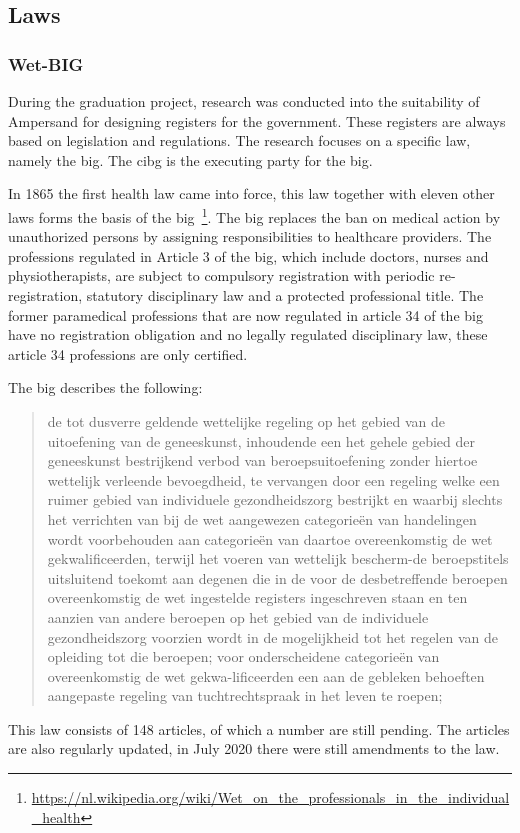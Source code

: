 \subsection{Laws} \label{subsection:law}
\subsubsection{Wet-BIG} \label{subsubsection:wet-big}
During the graduation project, research was conducted into the suitability of Ampersand for designing registers for the government.
These registers are always based on legislation and regulations.
The research focuses on a specific law, namely the \acrshort{big}.
The \acrshort{cibg} is the executing party for the \acrshort{big}.

In 1865 the first health law came into force, this law together with eleven other laws forms the basis of the \acrfull{big}~\footnote{\url{https://nl.wikipedia.org/wiki/Wet_on_the_professionals_in_the_individual_health}}.
The \acrshort{big} replaces the ban on medical action by unauthorized persons by assigning responsibilities to healthcare providers.
The professions regulated in Article 3 of the \acrshort{big}, which include doctors, nurses and physiotherapists, are subject to compulsory registration with periodic re-registration, statutory disciplinary law and a protected professional title.
The former paramedical professions that are now regulated in article 34 of the \acrshort{big} have no registration obligation and no legally regulated disciplinary law, these article 34 professions are only certified.

The \acrshort{big} describes the following:
\blockquote{de tot dusverre geldende wettelijke regeling op het gebied van de uitoefening van de geneeskunst, inhoudende een het gehele gebied der geneeskunst bestrijkend verbod van beroepsuitoefening zonder hiertoe wettelijk verleende bevoegdheid, te vervangen door een regeling welke een ruimer gebied van individuele gezondheidszorg bestrijkt en waarbij slechts het verrichten van bij de wet
aangewezen categorieën van handelingen wordt voorbehouden aan categorieën van daartoe overeenkomstig de wet gekwalificeerden, terwijl het voeren van wettelijk bescherm-de beroepstitels uitsluitend toekomt aan degenen die in de voor de desbetreffende beroepen overeenkomstig de wet ingestelde registers ingeschreven staan en ten aanzien van andere beroepen op het gebied van de individuele gezondheidszorg voorzien wordt in de mogelijkheid tot het regelen van de opleiding tot die beroepen; 
\newline
voor onderscheidene categorieën van overeenkomstig de wet gekwa-lificeerden een aan de gebleken behoeften aangepaste regeling van tuchtrechtspraak in het leven te roepen; }
This law consists of 148 articles, of which a number are still pending.
The articles are also regularly updated, in July 2020 there were still amendments to the law.

